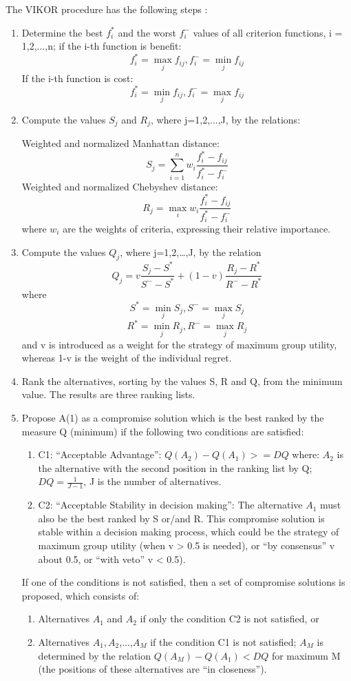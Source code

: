The VIKOR procedure has the following steps \cite{VIKOR_method_wiki}:
\begin{enumerate}
    \item Determine the best $f_{i}^{*}$ and the worst $f_{i}^{-}$ values of all criterion functions, i = 1,2,...,n; if the i-th function is benefit:
    $$f_{i}^{*} =  \max\limits_{j} f_{ij} , f_{i}^{-} = \min\limits_{j} f_{ij}$$
    If the i-th function is cost:
    $$f_{i}^{*} = \min\limits_{j} f_{ij} ,f_{i}^{-} = \max\limits_{j} f_{ij}$$
    \item Compute the values $S_{j}$ and $R_{j}$, where j=1,2,...,J, by the relations: 
    
    Weighted and normalized Manhattan distance:
    $$S_{j}=\sum_{i=1}^{n} w_{i} \frac{f_{i}^{*} - f_{ij}}{f_{i}^{*} - f_{i}^{-}}$$
    Weighted and normalized Chebyshev distance:
    $$R_{j}=\max\limits_{i} w_{i} \frac{f_{i}^{*} - f_{ij}}{f_{i}^{*} - f_{i}^{-}}$$
    where $w_{i}$ are the weights of criteria, expressing their relative importance.
    \item Compute the values $Q_{j}$, where j=1,2,…,J, by the relation
    $$Q_{j} = v \frac{S_{j}-S^{*}}{S^{-}-S^{*}} + (1-v)\frac{R_{j}-R^{*}}{R^{-}-R^{*}}$$
    where 
    $$ S^{*} = \min\limits_{j} S_{j},
    S^{-} = \max\limits_{j} S_{j} $$
    $$ R^{*} = \min\limits_{j} R_{j},
    R^{-} = \max\limits_{j} R_{j} $$
    and v is introduced as a weight for the strategy of maximum group utility, whereas 1-v is the weight of the individual regret.
    \item Rank the alternatives, sorting by the values S, R and Q, from the minimum value. The results are three ranking lists.
    \item Propose A(1) as a compromise solution which is the best ranked by the measure Q (minimum) if the following two conditions are satisfied:
    \begin{enumerate}
        \item C1: “Acceptable Advantage”: $Q(A_{2})-Q(A_{1}) >= DQ$
        where: $A_{2}$ is the alternative with the second position in the ranking list by Q; $DQ = \frac{1}{J-1}$, J is the number of alternatives.
        \item C2: “Acceptable Stability in decision making”: The alternative $A_{1}$ must also be the best ranked by S or/and R. This compromise solution is stable within a decision making process, which could be the strategy of maximum group utility (when v > 0.5 is needed), or “by consensus” v about 0.5, or “with veto” v < 0.5).
    \end{enumerate}
    If one of the conditions is not satisfied, then a set of compromise solutions is proposed, which consists of:
    \begin{enumerate}
        \item Alternatives $A_{1}$ and $A_{2}$ if only the condition C2 is not satisfied, or
        \item Alternatives $A_{1},A_{2}$,...,$A_{M}$ if the condition C1 is not satisfied; $A_{M}$ is determined by the relation $Q(A_{M})-Q(A_{1}) < DQ$ for maximum M (the positions of these alternatives are “in closeness”).
    \end{enumerate}
\end{enumerate}

